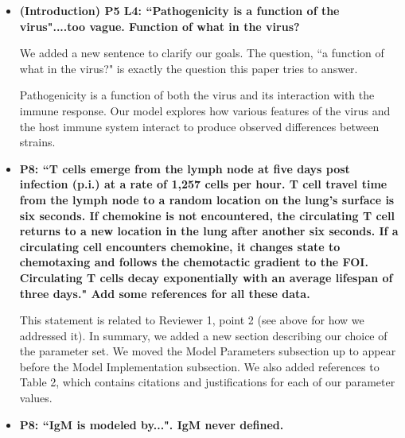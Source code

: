 \documentclass[10pt]{article}
\newcommand{\new}[1]{{\color{dkgreen}#1}}
\newenvironment{response}{\fontfamily{cms}\selectfont\small}{\par}
\begin{document}
\begin{itemize}

%

\item \textbf{(Introduction) P5 L4: ``Pathogenicity is a function of the virus"....too vague. Function of what in the virus?}

\begin{response}
We added a new sentence to clarify our goals.  The question, ``a function of what in the virus?" is exactly the question this paper tries to answer.

\begin{displayquote}
Pathogenicity is a function of \new{both} the virus and its interaction with the immune response. \new{Our model explores how various features of the virus and the host immune system interact to produce observed differences between strains.}
\end{displayquote}

\end{response}

\item \textbf{P8: ``T cells emerge from the lymph node at five days post infection (p.i.) at a rate of 1,257 cells per hour. T cell travel time from the lymph node to a random location on the lung's surface is six seconds. If chemokine is not encountered, the circulating T cell returns to a new location in the lung after another six seconds. If a circulating cell encounters chemokine, it changes state to chemotaxing and follows the chemotactic gradient to the FOI. Circulating T cells decay exponentially with an average lifespan of three days." Add some references for all these data.}

\begin{response}
This statement is related to Reviewer 1, point 2 (see above for how we addressed it). In summary, we added a new section describing our choice of the parameter set.  We moved the Model Parameters subsection up to appear before the Model Implementation subsection.  We also added references to Table 2, which contains citations and justifications for each of our parameter values.
\end{response}

\item \textbf{P8: ``IgM is modeled by...". IgM never defined.}


\end{itemize}
\end{document}
